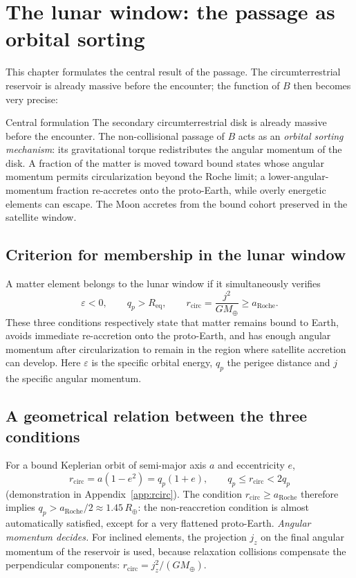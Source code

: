 \documentclass[11pt,a4paper,openany]{report}
\newcommand{\Mt}{M_{\oplus}}
\newcommand{\Rt}{R_{\oplus}}
\newcommand{\Req}{R_{\mathrm{eq}}}
\newcommand{\aR}{a_{\mathrm{Roche}}}
\begin{document}
\chapter{The lunar window: the passage as orbital sorting}
\label{ch:fenetre}

This chapter formulates the central result of the passage. The circumterrestrial reservoir is
already massive before the encounter; the function of $B$ then becomes very precise:

\begin{principe}{Central formulation}
The secondary circumterrestrial disk is already massive before the encounter. The non-collisional
passage of $B$ acts as an \emph{orbital sorting mechanism}: its gravitational torque redistributes
the angular momentum of the disk. A fraction of the matter is moved toward bound states whose
angular momentum permits circularization beyond the Roche limit; a lower-angular-momentum fraction
re-accretes onto the proto-Earth, while overly energetic elements can escape. The Moon accretes
from the bound cohort preserved in the satellite window.
\end{principe}

\section{Criterion for membership in the lunar window}

A matter element belongs to the lunar window if it simultaneously verifies
\begin{equation}
\boxed{\;\varepsilon<0,\qquad q_p>\Req,\qquad r_{\mathrm{circ}}=\frac{j^2}{G\Mt}\ge\aR.\;}
\label{eq:fenetre}
\end{equation}
These three conditions respectively state that matter remains bound to Earth, avoids immediate
re-accretion onto the proto-Earth, and has enough angular momentum after circularization to remain
in the region where satellite accretion can develop. Here $\varepsilon$ is the specific orbital
energy, $q_p$ the perigee distance and $j$ the specific angular momentum.

\section{A geometrical relation between the three conditions}

For a bound Keplerian orbit of semi-major axis $a$ and eccentricity $e$,
\begin{equation}
r_{\mathrm{circ}}=a(1-e^2)=q_p(1+e),\qquad q_p\le r_{\mathrm{circ}}<2q_p
\label{eq:rcirc-qp}
\end{equation}
(demonstration in Appendix~\ref{app:rcirc}). The condition $r_{\mathrm{circ}}\ge\aR$ therefore
implies $q_p>\aR/2\approx1.45\,\Rt$: the non-reaccretion condition is almost automatically
satisfied, except for a very flattened proto-Earth. \emph{Angular momentum decides.} For inclined
elements, the projection $j_z$ on the final angular momentum of the reservoir is used, because
relaxation collisions compensate the perpendicular components: $r_{\mathrm{circ}}=j_z^2/(G\Mt)$.
\end{document}
